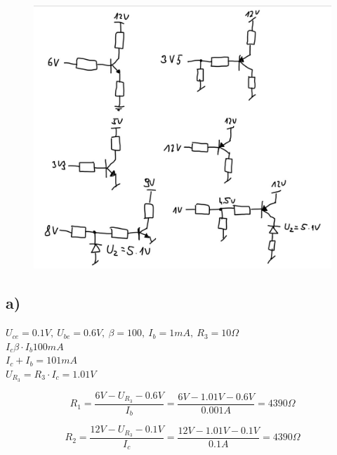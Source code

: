 \documentclass{article}
\begin{document}
\begin{figure}[h!]
    \centering
    \includegraphics[scale=0.6]{rysunek.jpg}
\end{figure}


\newpage

\subsection{a)}

$U_{ce} = 0.1V, \ U_{be} = 0.6V, \ \beta = 100, \ I_{b} = 1mA, \ R_{3} = 10\Omega$\\
$I_{c}\beta \cdot I_{b}  100mA$\\
$I_{c}+I_{b}=101mA$\\
$U_{R_{3}} = R_{3}\cdot I_{c} = 1.01V$

$$
    R_{1}=\frac{6V-U_{R_{3}}-0.6V}{I_{b}}=\frac{6V-1.01V-0.6V}{0.001A}=4390\Omega
$$

$$
    R_{2}=\frac{12V-U_{R_{3}}-0.1V}{I_{c}}=\frac{12V-1.01V-0.1V}{0.1A}=4390\Omega
$$
\end{document}
